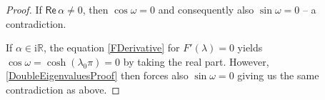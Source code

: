 \documentclass[10pt,a4paper]{amsart}
\renewcommand{\Re}{\mathsf{Re}\,}
\begin{document}
\begin{proof}
    If $\Re \alpha \neq 0$, then $\cos\omega = 0$ and consequently also $\sin\omega = 0$ -- a contradiction.
    
    If $\alpha \in \mathrm{i}\mathbb R$, the equation \eqref{FDerivative} for $F'(\lambda) = 0$ yields $\cos\omega = \cosh(\lambda_0\pi) = 0$ by taking the real part. However, \eqref{DoubleEigenvaluesProof} then forces also $\sin\omega = 0$ giving us the same contradiction as above.
\end{proof}
\end{document}
